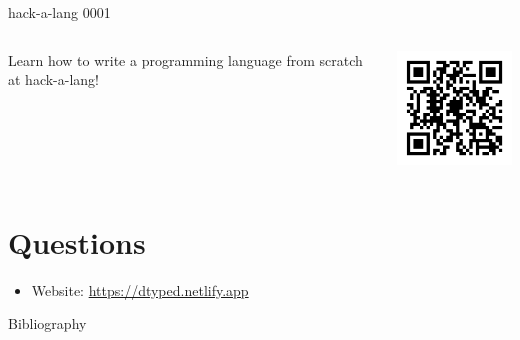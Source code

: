 \documentclass{beamer}
\begin{document}
\begin{frame}{hack-a-lang 0001}
  \begin{columns}
    \begin{column}{0.5\textwidth}
      Learn how to write a programming language from scratch at hack-a-lang!
    \end{column}
    \begin{column}{0.3\textwidth}
      \centering
      \includegraphics[width=\textwidth]{assets/hack-a-lang-qr.png}
    \end{column}
  \end{columns}
\end{frame}

\section{Questions}

\begin{frame}
  \begin{itemize}
  \item Website: \url{https://dtyped.netlify.app}
  \end{itemize}
\end{frame}

\begin{frame}[allowframebreaks]{Bibliography}
\printbibliography
\end{frame}
\end{document}
